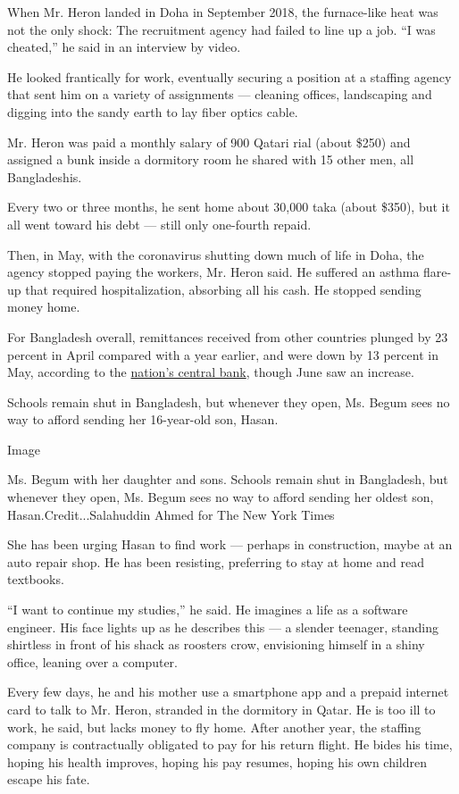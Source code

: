 When Mr. Heron landed in Doha in September 2018, the furnace-like heat
was not the only shock: The recruitment agency had failed to line up a
job. ``I was cheated,'' he said in an interview by video.

He looked frantically for work, eventually securing a position at a
staffing agency that sent him on a variety of assignments --- cleaning
offices, landscaping and digging into the sandy earth to lay fiber
optics cable.

Mr. Heron was paid a monthly salary of 900 Qatari rial (about \$250) and
assigned a bunk inside a dormitory room he shared with 15 other men, all
Bangladeshis.

Every two or three months, he sent home about 30,000 taka (about \$350),
but it all went toward his debt --- still only one-fourth repaid.

Then, in May, with the coronavirus shutting down much of life in Doha,
the agency stopped paying the workers, Mr. Heron said. He suffered an
asthma flare-up that required hospitalization, absorbing all his cash.
He stopped sending money home.

For Bangladesh overall, remittances received from other countries
plunged by 23 percent in April compared with a year earlier, and were
down by 13 percent in May, according to the
\href{https://www.bb.org.bd/econdata/wageremitance.php}{nation's central
bank}, though June saw an increase.

Schools remain shut in Bangladesh, but whenever they open, Ms. Begum
sees no way to afford sending her 16-year-old son, Hasan.

Image

Ms. Begum with her daughter and sons. Schools remain shut in Bangladesh,
but whenever they open, Ms. Begum sees no way to afford sending her
oldest son, Hasan.Credit...Salahuddin Ahmed for The New York Times

She has been urging Hasan to find work --- perhaps in construction,
maybe at an auto repair shop. He has been resisting, preferring to stay
at home and read textbooks.

``I want to continue my studies,'' he said. He imagines a life as a
software engineer. His face lights up as he describes this --- a slender
teenager, standing shirtless in front of his shack as roosters crow,
envisioning himself in a shiny office, leaning over a computer.

Every few days, he and his mother use a smartphone app and a prepaid
internet card to talk to Mr. Heron, stranded in the dormitory in Qatar.
He is too ill to work, he said, but lacks money to fly home. After
another year, the staffing company is contractually obligated to pay for
his return flight. He bides his time, hoping his health improves, hoping
his pay resumes, hoping his own children escape his fate.

